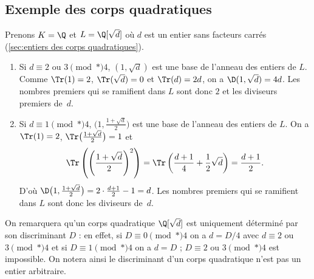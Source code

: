 \documentclass[11pt, %
  title in boldface,
  theorem in new line,
  theorem numbering = section,
  number theorems separately,
  simple name,
]{beaulivre}
\begin{document}
\smallskip
    \subsection*{Exemple des corps quadratiques}
        Prenons \( K = \Q \) et \( L = \Q[\sqrt{d}] \) où \( d \) est un entier sans facteurs carrés (\cref{sec:entiers des corps quadratiques}).
        \begin{enumerate}
            \item Si \( d \equiv 2 \) ou \( 3 \pmod*{4} \), \( (1, \sqrt{d}) \) est une base de l'anneau des entiers de \( L \). Comme \( \Tr(1) = 2 \), \( \Tr(\sqrt{d}) = 0 \) et \( \Tr(d) = 2d \), on a \( \D(1, \sqrt{d}) = 4d \). Les nombres premiers qui se ramifient dans \( L \) sont donc \( 2 \) et les diviseurs premiers de~\( d \).
            \item Si \( d \equiv 1 \pmod*{4} \), \( \bigl(1, \frac{1+\sqrt{d}}{2}\bigr) \) est une base de l'anneau des entiers de \( L \). On a \( \Tr(1) = 2 \), \( \Tr\bigl(\frac{1+\sqrt{d}}{2}\bigr) = 1 \) et
            \[
                \Tr\left(\left(\frac{1+\sqrt{d}}{2}\right)^2\right) = \Tr\left(\frac{d+1}{4}+\frac{1}{2}\sqrt{d}\right) = \frac{d+1}{2}.
            \]
            D'où \( \D\bigl(1, \frac{1+\sqrt{d}}{2}\bigr) = 2 \cdot \frac{d+1}{2} - 1 = d \). Les nombres premiers qui se ramifient dans \( L \) sont donc les diviseurs de~\( d \).
        \end{enumerate}

        On remarquera qu'un corps quadratique \( \Q[\sqrt{d}] \) est uniquement déterminé par son discriminant \( D \) : en effet, si \( D \equiv 0 \pmod*{4} \) on a \( d = D/4 \) avec \( d \equiv 2 \) ou \( 3 \pmod*{4} \) et si \( D \equiv 1 \pmod*{4} \) on a \( d = D \) ; \( D \equiv 2 \) ou \( 3 \pmod*{4} \) est impossible. On notera ainsi le discriminant d'un corps quadratique n'est pas un entier arbitraire.
\end{document}
